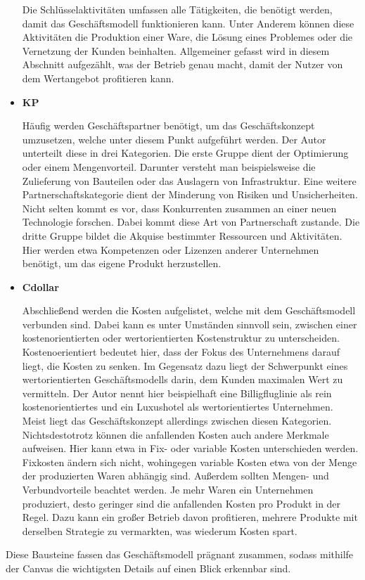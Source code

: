 \begin{itemize}
	Die Schlüsselaktivitäten umfassen alle Tätigkeiten, die benötigt werden, damit das Geschäftsmodell funktionieren kann. Unter Anderem können diese Aktivitäten die Produktion einer Ware, die Lösung eines Problemes oder die Vernetzung der Kunden beinhalten. Allgemeiner gefasst wird in diesem Abschnitt aufgezählt, was der Betrieb genau macht, damit der Nutzer von dem Wertangebot profitieren kann.
	
	\item \textbf{\ac{KP}}
	
	Häufig werden Geschäftspartner benötigt, um das Geschäftskonzept umzusetzen, welche unter diesem Punkt aufgeführt werden. Der Autor unterteilt diese in drei Kategorien. Die erste Gruppe dient der Optimierung oder einem Mengenvorteil. Darunter versteht man beispielsweise die Zulieferung von Bauteilen oder das Auslagern von Infrastruktur. Eine weitere Partnerschaftskategorie dient der Minderung von Risiken und Unsicherheiten. Nicht selten kommt es vor, dass Konkurrenten zusammen an einer neuen Technologie forschen. Dabei kommt diese Art von Partnerschaft zustande. Die dritte Gruppe bildet die Akquise bestimmter Ressourcen und Aktivitäten. Hier werden etwa Kompetenzen oder Lizenzen anderer Unternehmen benötigt, um das eigene Produkt herzustellen.
	
	\item \textbf{\ac{Cdollar}}
	
	Abschließend werden die Kosten aufgelistet, welche mit dem Geschäftsmodell verbunden sind. Dabei kann es unter Umständen sinnvoll sein, zwischen einer kostenorientierten oder wertorientierten Kostenstruktur zu unterscheiden. Kostenoerientiert bedeutet hier, dass der Fokus des Unternehmens darauf liegt, die Kosten zu senken. Im Gegensatz dazu liegt der Schwerpunkt eines wertorientierten Geschäftsmodells darin, dem Kunden maximalen Wert zu vermitteln. Der Autor nennt hier beispielhaft eine Billigfluglinie als rein kostenorientiertes und ein Luxushotel als wertorientiertes Unternehmen. Meist liegt das Geschäftskonzept allerdings zwischen diesen Kategorien. Nichtsdestotrotz können die anfallenden Kosten auch andere Merkmale aufweisen. Hier kann etwa in Fix- oder variable Kosten unterschieden werden. Fixkosten ändern sich nicht, wohingegen variable Kosten etwa von der Menge der produzierten Waren abhängig sind. Außerdem sollten Mengen- und Verbundvorteile beachtet werden. Je mehr Waren ein Unternehmen produziert, desto geringer sind die anfallenden Kosten pro Produkt in der Regel. Dazu kann ein großer Betrieb davon profitieren, mehrere Produkte mit derselben Strategie zu vermarkten, was wiederum Kosten spart.
	
\end{itemize}

Diese Bausteine fassen das Geschäftsmodell prägnant zusammen, sodass mithilfe der Canvas die wichtigsten Details auf einen Blick erkennbar sind.
\cite{BusinessModelGeneration}